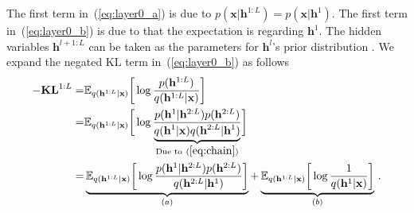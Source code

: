 \documentclass[twoside]{article}
\begin{document}
The first term in~(\ref{eq:layer0_a}) is due to $p(\mathbf{x}|\mathbf{h}^{1:L}) =  p(\mathbf{x}|\mathbf{h}^{1})$. 
The first term in~(\ref{eq:layer0_b}) is due to that the expectation is regarding $\mathbf{h}^{1}$. 
The hidden variables $\mathbf{h}^{l+1:L}$ can be taken as the parameters for $\mathbf{h}^l$'s  prior distribution .  
We expand the negated KL term in~(\ref{eq:layer0_b}) as follows
\begin{align} \label{eq:kl_1}
-\textbf{\text{KL}}^{1:L} =& \mathbb{E}_{q(\mathbf{h}^{1:L} | \mathbf{x})} \bigg[ \log  \frac{p( \mathbf{h}^{1:L})}{q(\mathbf{h}^{1:L}|\mathbf{x})}  \bigg]   \\ \notag
= &   \mathbb{E}_{q(\mathbf{h}^{1:L} | \mathbf{x})} \bigg[ \log  \frac{p( \mathbf{h}^{1}|  \mathbf{h}^{2:L}) p( \mathbf{h}^{2:L})  }{\underbrace{ q(\mathbf{h}^{1}|\mathbf{x}) q(\mathbf{h}^{2:L}|\mathbf{h}^1)}_{\text{Due to}~(\ref{eq:chain}) } }  \bigg] \\ \notag
=&  \underbrace{  \mathbb{E}_{q(\mathbf{h}^{1:L} | \mathbf{x})} \bigg[ \log  \frac{p( \mathbf{h}^{1}|  \mathbf{h}^{2:L}) p( \mathbf{h}^{2:L})  }{ q(\mathbf{h}^{2:L}|\mathbf{h}^1)}  \bigg]  }_{(a)} +   \underbrace{\mathbb{E}_{q(\mathbf{h}^{1:L} | \mathbf{x})} \bigg[ \log \frac{1}{q(\mathbf{h}^{1}|\mathbf{x}) } \bigg] }_{(b)} \, .  \notag
\end{align}
\end{document}
